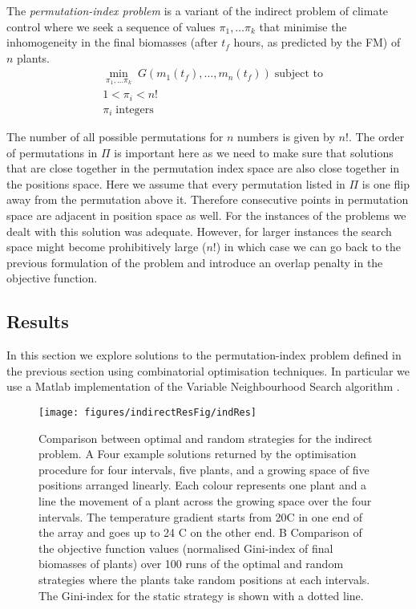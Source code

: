 \begin{definition}
The \emph{permutation-index problem} is a variant of the indirect problem of
climate control where we seek a sequence of values $\pi_1, \dots \pi_k$ that minimise the
inhomogeneity in the final biomasses (after $t_f$ hours, as predicted by the FM)
of $n$ plants.
\begin{align*}
& \min_{\pi_1, \dots \pi_k} \; G(m_1(t_f), \dots, m_n(t_f)) \; \text{subject to} \\
& 1 < \pi_i < n! \\
& \pi_i \; \text{integers}
\end{align*}
\end{definition}

The number of all possible permutations for $n$ numbers is given by $n!$. The
order of permutations in $\Pi$ is important here as we need to make sure that
solutions that are close together in the permutation index space are also close
together in the positions space. Here we assume that every permutation listed in
$\Pi$ is one flip away from the permutation above it. Therefore consecutive
points in permutation space are adjacent in position space as well. For the
instances of the problems we dealt with this solution was adequate. However, for
larger instances the search space might become prohibitively large ($n!$) in
which case we can go back to the previous formulation of the problem and
introduce an overlap penalty in the objective function.

\subsection{Results} 
In this section we explore solutions to the permutation-index problem defined in
the previous section using combinatorial optimisation techniques. In particular
we use a Matlab implementation \citep[MEIGO too;][]{banga2014} of the Variable
Neighbourhood Search algorithm \citep[VNS;][]{mladenovic1997variable}.

\begin{figure}[tb]
\centering
\texttt{[image: figures/indirectResFig/indRes]}
\caption{
  Comparison between optimal and random strategies for the indirect problem. A
Four example solutions returned by the optimisation procedure for four
intervals, five plants, and a growing space of five positions arranged
linearly. Each colour represents one plant and a line the movement of a plant
across the growing space over the four intervals. The temperature gradient
starts from 20\textdegree C in one end of the array and goes up to 24\textdegree
C on the other end. B Comparison of the objective function values (normalised
Gini-index of final biomasses of plants) over 100 runs of the optimal and random
strategies where the plants take random positions at each intervals. The
Gini-index for the static strategy is shown with a dotted line.
}
\label{fig:compsAllInDir}
\end{figure}

